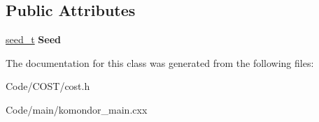 \subsection*{Public Attributes}
\begin{DoxyCompactItemize}
\item 
\mbox{\label{classCostSimEng_aeec0087ded10eba570880f8ab34306f1}} 
\hyperlink{classCostSimEng_1_1seed__t}{seed\+\_\+t} {\bfseries Seed}
\end{DoxyCompactItemize}


The documentation for this class was generated from the following files\+:\begin{DoxyCompactItemize}
\item 
Code/\+C\+O\+S\+T/cost.\+h\item 
Code/main/komondor\+\_\+main.\+cxx\end{DoxyCompactItemize}
